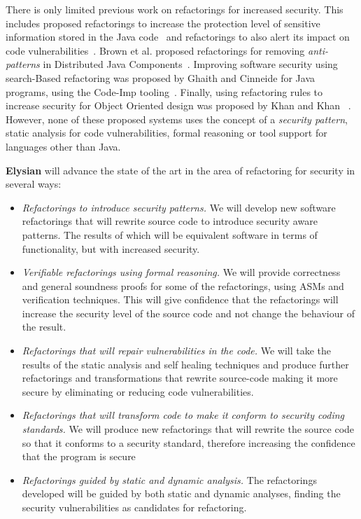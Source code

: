 \documentclass[a4paper,11pt]{article}
\newcommand{\project}[1]{\textbf{#1}\xspace}
\newcommand{\SECURITY}{\project{Elysian}}
\newcommand{\TheProject}{\SECURITY}
\begin{document}
%
There is only limited previous work on refactorings for increased security. This includes proposed refactorings to increase the protection level of sensitive information stored in the Java code~\cite{maru2007} and refactorings to also alert its impact on code vulnerabilities~\cite{maru2008}.
Brown et al. proposed refactorings for removing \emph{anti-patterns} in Distributed Java Components~\cite{brown1998antipatterns}.  Improving software security using search-Based refactoring was proposed by Ghaith and Cinneide for Java programs, using the Code-Imp tooling~\cite{ghaith}. Finally, using refactoring rules to increase security for Object Oriented design was proposed by Khan and Khan~\cite{khan} . However, none of these proposed systems uses the concept of a \emph{security pattern}, static analysis for code vulnerabilities, formal reasoning or tool support for languages other than Java. 
 
\begin{mdframed}[backgroundcolor=gray!10]
\TheProject{} will advance the state of the art in the area of refactoring for security in several ways:
\begin{itemize}
\item \emph{Refactorings to introduce security patterns.} We will develop new software refactorings that will rewrite source code to introduce security aware patterns. The results of which will be equivalent software in terms of functionality, but with increased security.
\item \emph{Verifiable refactorings using formal reasoning.} We will provide correctness and general soundness proofs for some of the refactorings, using ASMs and verification techniques. This will give confidence that the refactorings will increase the security level of the source code and not change the behaviour of the result.
\item \emph{Refactorings that will repair vulnerabilities in the code.} We will take the results of the static analysis and self healing techniques and produce further refactorings and transformations that rewrite source-code making it more secure by eliminating or reducing code vulnerabilities. 
\item \emph{Refactorings that will transform code to make it conform to security coding standards.} We will produce new refactorings that will rewrite the source code so that it conforms to a security standard, therefore increasing the confidence that the program is secure
\item \emph{Refactorings guided by static and dynamic analysis.} The refactorings developed will be guided by both static and dynamic analyses, finding the security vulnerabilities as candidates for refactoring. 
\end{itemize}
\end{mdframed}
\end{document}

